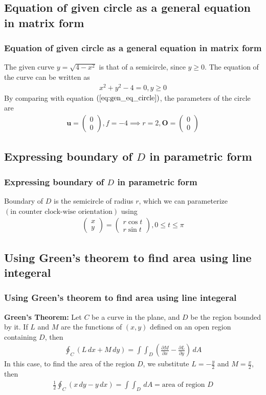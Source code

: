 \documentclass{beamer}
\providecommand{\brak}[1]{\ensuremath{\left(#1\right)}}
\theoremstyle{remark}
\newcommand{\myvec}[1]{\ensuremath{\begin{pmatrix}#1\end{pmatrix}}}
\let\vec\mathbf
\numberwithin{equation}{section}
\begin{document}
\subsection{Equation of given circle as a general equation in matrix form}
\begin{frame}
\frametitle{Equation of given circle as a general equation in matrix form}

The given curve $y = \sqrt{4 - x^2}$ is that of a semicircle, since $y \geq 0$.
The equation of the curve can be written as
\begin{align}
	x^2 + y^2 - 4 = 0, y \geq 0
\end{align}
By comparing with equation $\brak{\ref{eq:gen_eq_circle}}$, the parameters of the circle are
\begin{align}
	\vec{u} = \myvec{0\\0}, f = -4 \implies r = 2, \vec{O} = \myvec{0\\0}
\end{align}

\end{frame}

\subsection{Expressing boundary of $D$ in parametric form}
\begin{frame}
\frametitle{Expressing boundary of $D$ in parametric form}

Boundary of $D$ is the semicircle of radius $r$, which we can parameterize \brak{\text{in counter clock-wise orientation}} using
\begin{align}
	\myvec{x\\y} = \myvec{r\cos{t}\\r\sin{t}}, 0\leq t \leq \pi
\end{align}

\end{frame}

\subsection{Using Green's theorem to find area using line integeral}
\begin{frame}
\frametitle{Using Green's theorem to find area using line integeral}

\textbf{Green's Theorem:}
\newline
Let $C$ be a curve in the plane, and $D$ be the region bounded by it. If $L$ and $M$ are the functions of $\brak{x, y}$ defined on an open region containing $D$, then
\begin{align}
  \oint_{C} \brak{L\, dx + M\, dy} = \int \int_{D} \brak{\frac{\partial{M}}{\partial{x}} - \frac{\partial{L}}{\partial{y}}} \, dA
\end{align}
In this case, to find the area of the region $D$, we substitute $L = -\frac{y}{2}$ and $M = \frac{x}{2}$, then
\begin{align}
\label{eq:greens_theorem}
  \frac{1}{2} \oint_{C} \brak{x\, dy - y\, dx} = \int \int_D \, dA = \text{area of region } D
\end{align}
\end{frame}
\end{document}
